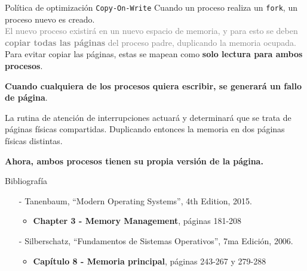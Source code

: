 \documentclass[aspectratio=169]{beamer}
\begin{document}
\begin{frame}{Política de optimización \texttt{Copy-On-Write}}
    \small
    Cuando un proceso realiza un \texttt{fork}, un proceso nuevo es creado.\\
    \medskip
    \textcolor{gray}{El nuevo proceso existirá en un nuevo espacio de memoria, y para esto se deben\\ \textbf{copiar todas las páginas} del proceso padre, duplicando la memoria ocupada.}\\
    \medskip
    \pause
    Para evitar copiar las páginas, estas se mapean como \textbf{solo lectura para ambos procesos}.\\
    \medskip
    \begin{center}
    \textcolor{verdeuca}{\textbf{Cuando cualquiera de los procesos quiera escribir, se generará un fallo de página}}.\\
    \pause
    \end{center}
    \medskip
    La rutina de atención de interrupciones actuará y determinará que se trata de páginas físicas compartidas.
    Duplicando entonces la memoria en dos páginas físicas distintas.\\
    \medskip
    \begin{center}
    \textcolor{naranjauca}{\textbf{Ahora, ambos procesos tienen su propia versión de la página.}}\\
    \end{center}
\end{frame}

\begin{frame}[fragile]{Bibliografía}
    \begin{itemize}
        \setlength\itemsep{0.5cm}
        \item[-] \small Tanenbaum, ``Modern Operating Systems'', 4th Edition, 2015.\\
        \begin{itemize}
            \item \textbf{Chapter 3 - Memory Management}, páginas 181-208
        \end{itemize}
        \item[-] \small Silberschatz, ``Fundamentos de Sistemas Operativos'', 7ma Edición, 2006.\\
        \begin{itemize}
            \item \textbf{Capítulo 8 - Memoria principal}, páginas 243-267 y 279-288
        \end{itemize}
    \end{itemize}
\end{frame}
\end{document}
